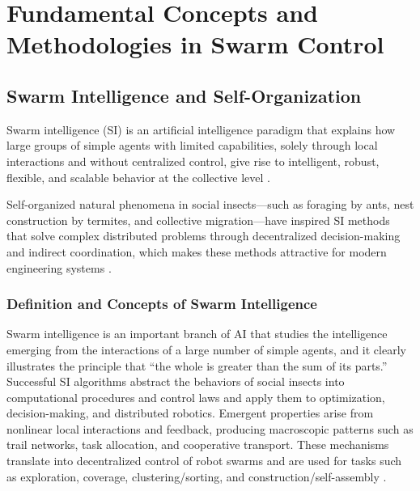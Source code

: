 \chapter{Fundamental Concepts and Methodologies in Swarm Control}\label{chap:fundamentals}

\section{Swarm Intelligence and Self-Organization}\label{sec:si}

Swarm intelligence (SI) is an artificial intelligence paradigm that explains how
large groups of simple agents with limited capabilities, solely through local
interactions and without centralized control, give rise to intelligent, robust,
flexible, and scalable behavior at the collective level \cite{bonabeau1999swarm}.

Self-organized natural phenomena in social insects---such as foraging by ants,
nest construction by termites, and collective migration---have inspired SI
methods that solve complex distributed problems through decentralized
decision-making and indirect coordination, which makes these methods attractive
for modern engineering systems \cite{garnier2007biological}.

\subsection{Definition and Concepts of Swarm Intelligence}

Swarm intelligence is an important branch of AI that studies the intelligence
emerging from the interactions of a large number of simple agents, and it
clearly illustrates the principle that ``the whole is greater than the sum of
its parts.'' Successful SI algorithms abstract the behaviors of social insects
into computational procedures and control laws and apply them to optimization,
decision-making, and distributed robotics. Emergent properties arise from
nonlinear local interactions and feedback, producing macroscopic patterns such
as trail networks, task allocation, and cooperative transport. These mechanisms
translate into decentralized control of robot swarms and are used for tasks such
as exploration, coverage, clustering/sorting, and construction/self-assembly
\cite{bonabeau1999swarm,bhowmick2024bio}.

